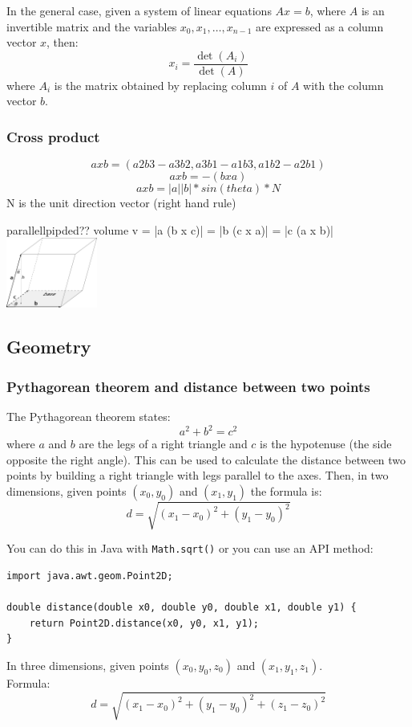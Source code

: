 \documentclass[a4paper,12pt]{article}
\begin{document}
\noindent In the general case, given a system of linear equations $Ax=b$, where $A$ is an invertible matrix and the variables $x_0,x_1,\ldots,x_{n-1}$ are expressed as a column vector $x$, then:
\[x_i=\frac{\det(A_i)}{\det(A)}\]
\noindent where $A_i$ is the matrix obtained by replacing column $i$ of $A$ with the column vector $b$.




\subsubsection{Cross product}
\[a x b = (a2b3 - a3b2, a3b1 - a1b3, a1b2 - a2b1)\]
\[a x b = -(bxa)\]
\[a x b = |a||b|*sin(theta)* N\]
N is the unit direction vector (right hand rule)

parallellpipded?? volume
v = |a \cdot (b x c)| = |b \cdot (c x a)| = |c \cdot (a x b)|
\includegraphics[width=30mm]{pp.png}




\subsection{Geometry}
\subsubsection{Pythagorean theorem and distance between two points}
\noindent The Pythagorean theorem states:
\[a^2+b^2=c^2\]
\noindent where $a$ and $b$ are the legs of a right triangle and $c$ is the hypotenuse (the side opposite the right angle). This can be used to calculate the distance between two points by building a right triangle with legs parallel to the axes. Then, in two dimensions, given points $(x_0, y_0)$ and $(x_1, y_1)$ the formula is:
\[ d = \sqrt{(x_1 - x_0)^2 + (y_1 - y_0)^2} \]

\noindent You can do this in Java with \lstinline/Math.sqrt()/ or you can use an API method:
\begin{lstlisting}
import java.awt.geom.Point2D;

double distance(double x0, double y0, double x1, double y1) {
	return Point2D.distance(x0, y0, x1, y1);
}
\end{lstlisting}

\noindent In three dimensions, given points $(x_0, y_0, z_0)$ and $(x_1, y_1, z_1)$. \\ Formula:
\[ d = \sqrt{(x_1 - x_0)^2 + (y_1 - y_0)^2 + (z_1 - z_0)^2} \]
\end{document}
